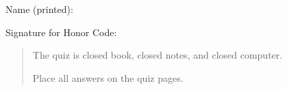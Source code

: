 


\thispagestyle{empty}

\begin{center}
\parbox{4.5in}{
Name (printed): \underline{\hspace{2.5in}}

\bigskip
Signature for Honor Code: \underline{\hspace{2.5in}}
}

\end{center}

\begin{quote}
The quiz is closed book, closed notes, and closed computer. 

Place all answers on the quiz pages.
\end{quote}


